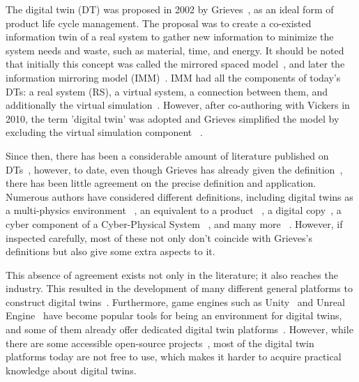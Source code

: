 \documentclass[conference]{IEEEtran}
\begin{document}
    The digital twin (DT) was proposed in 2002 by Grieves~\cite{Originsofdigitaltwinconcept}, as an ideal form of product life cycle management. The proposal was to create a co-existed information twin of 
    a real system to gather new information to minimize the system needs and waste, such as material, time, and energy. It should be noted that initially this concept was called the mirrored spaced model~\cite{Originsofdigitaltwinconcept}, 
    and later the information mirroring model (IMM)~\cite{GrievesPLMBook,2005ArticleGrievesMichael}. IMM had all the components of today's DTs: a real system (RS), a virtual system, 
    a connection between them, and additionally the virtual simulation~\cite{GrievesPLMBook}.
    However, after co-authoring with Vickers in 2010, the term 'digital twin' was adopted and Grieves simplified the model by excluding the virtual simulation component ~\cite{Originsofdigitaltwinconcept}. 
    
    Since then, there has been a considerable amount of literature published on DTs~\cite{Review1,Review2},
    however, to date, even though Grieves has already given the definition~\cite{Originsofdigitaltwinconcept}, there has been little agreement on the precise definition and application. 
    Numerous authors have considered different definitions, including digital twins as a multi-physics environment ~\cite{TheDigitalTwinParadigmforFutureNASAandUSAirForceVehicles}, an equivalent to a product
    ~\cite{SCHROEDER201612}, a digital copy~\cite{SODERBERG2017137}, a cyber component of a Cyber-Physical System ~\cite{ADigitalTwinArchitectureReferenceModelfortheCloudBasedCyberPhysicalSystems},
    and many more ~\cite{Digitaltwindrivenproductdesignframework,ConferenceonNetworking,Thedigitaltwinimplementationforlinkingthevirtualrepresentationof}. 
    However, if inspected carefully, most of these not only don't coincide with Grieves's definitions but also give some extra aspects to it. 
   
    This absence of agreement exists not only in the literature; it also reaches the industry. This resulted in the development of many different 
    general platforms to construct digital twins~\cite{Ansys,DSDIGITALTWIN}. Furthermore, game engines such as Unity~\cite{Unity} and Unreal Engine~\cite{UnrealEngine} have become popular tools for being an 
    environment for digital twins, and some of them already offer dedicated digital twin platforms~\cite{UnityDT,UnrealEngineDT}. 
    However, while there are some accessible open-source projects~\cite{EclipseDitto,iTwin}, most of the digital twin platforms today are not free to use, 
    which makes it harder to acquire practical knowledge about digital twins. 
\end{document}
